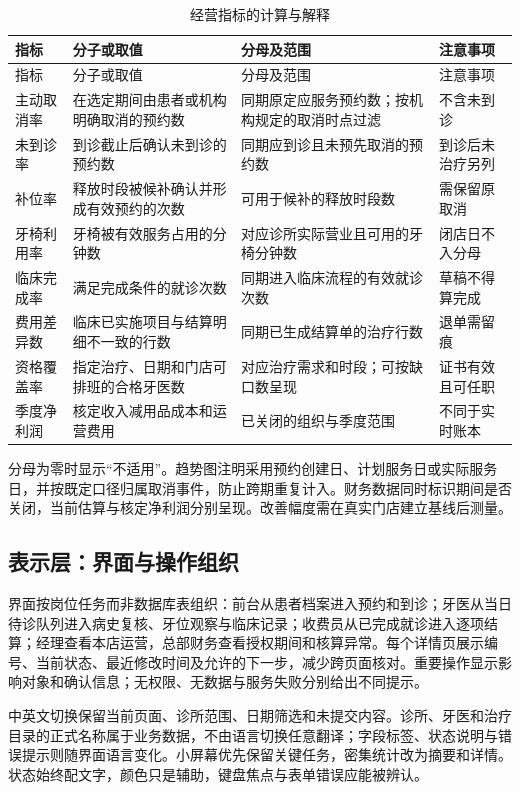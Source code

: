 \documentclass[12pt,a4paper,fontset=windows]{ctexart}
\begin{document}
\begin{longtable}{@{}L{30mm}L{47mm}L{48mm}L{23mm}@{}}
\caption{经营指标的计算与解释}\label{tab:metric-definitions}\\\toprule
指标 & 分子或取值 & 分母及范围 & 注意事项\\\midrule\endfirsthead
\toprule 指标 & 分子或取值 & 分母及范围 & 注意事项\\\midrule\endhead
主动取消率 & 在选定期间由患者或机构明确取消的预约数 & 同期原定应服务预约数；按机构规定的取消时点过滤 & 不含未到诊\\
未到诊率 & 到诊截止后确认未到诊的预约数 & 同期应到诊且未预先取消的预约数 & 到诊后未治疗另列\\
补位率 & 释放时段被候补确认并形成有效预约的次数 & 可用于候补的释放时段数 & 需保留原取消\\
牙椅利用率 & 牙椅被有效服务占用的分钟数 & 对应诊所实际营业且可用的牙椅分钟数 & 闭店日不入分母\\
临床完成率 & 满足完成条件的就诊次数 & 同期进入临床流程的有效就诊次数 & 草稿不得算完成\\
费用差异数 & 临床已实施项目与结算明细不一致的行数 & 同期已生成结算单的治疗行数 & 退单需留痕\\
资格覆盖率 & 指定治疗、日期和门店可排班的合格牙医数 & 对应治疗需求和时段；可按缺口数呈现 & 证书有效且可任职\\
季度净利润 & 核定收入减用品成本和运营费用 & 已关闭的组织与季度范围 & 不同于实时账本\\
\bottomrule\end{longtable}

分母为零时显示“不适用”。趋势图注明采用预约创建日、计划服务日或实际服务日，并按既定口径归属取消事件，防止跨期重复计入。财务数据同时标识期间是否关闭，当前估算与核定净利润分别呈现。改善幅度需在真实门店建立基线后测量。

\subsection{表示层：界面与操作组织}
界面按岗位任务而非数据库表组织：前台从患者档案进入预约和到诊；牙医从当日待诊队列进入病史复核、牙位观察与临床记录；收费员从已完成就诊进入逐项结算；经理查看本店运营，总部财务查看授权期间和核算异常。每个详情页展示编号、当前状态、最近修改时间及允许的下一步，减少跨页面核对。重要操作显示影响对象和确认信息；无权限、无数据与服务失败分别给出不同提示。

中英文切换保留当前页面、诊所范围、日期筛选和未提交内容。诊所、牙医和治疗目录的正式名称属于业务数据，不由语言切换任意翻译；字段标签、状态说明与错误提示则随界面语言变化。小屏幕优先保留关键任务，密集统计改为摘要和详情。状态始终配文字，颜色只是辅助，键盘焦点与表单错误应能被辨认。
\end{document}

